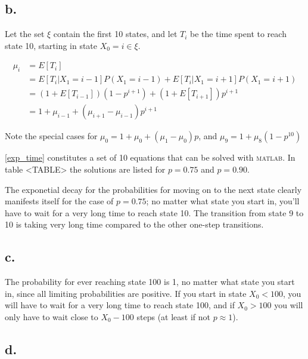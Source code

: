 \subsection*{b.}

Let the set $\xi$ contain the first 10 states, and let $T_i$ be the time spent to reach state 10, starting in state $X_0 = i \in \xi$. 


\begin{equation}
\label{exp_time}
\begin{aligned}
 \mu_i &= E[T_i] \\
       &= E[T_{i}|X_1 = i-1]P(X_1=i-1) + E[T_{i}|X_1 = i+1]P(X_1=i+1) \\
       &= ( 1+E[T_{i-1}] )( 1-p^{i+1} ) + ( 1+E[T_{i+1}] )p^{i+1} \\
       &= 1 + \mu_{i-1} + ( \mu_{i+1} - \mu_{i-1} )p^{i+1}
\end{aligned}
\end{equation}

Note the special cases for $\mu_0 = 1 + \mu_0 + (\mu_1 - \mu_0)p$, and $\mu_9 = 1 + \mu_8(1-p^{10})$

\cref{exp_time} constitutes a set of 10 equations that can be solved with \textsc{matlab}. 
In table <TABLE> the solutions are listed for $p=0.75$ and $p=0.90$.


The exponetial decay for the probabilities for moving on to the next state  clearly manifests itself for the case of $p=0.75$; no matter what state you start in, you'll have to wait for a very long time to reach state 10. The transition from state 9 to 10 is taking very long time compared to the other one-step transitions. 


\subsection*{c.}

The probability for ever reaching state 100 is 1, no matter what state you start in, since all limiting probabilities are positive. If you start in state $X_0<100$, you will have to wait for a very long time to reach state 100, and if $X_0>100$ you will only have to wait close to $X_0 - 100$ steps (at least if not $p \approx 1$).


\subsection*{d.}

